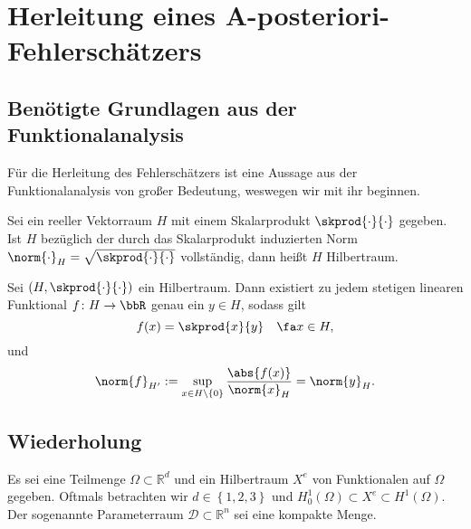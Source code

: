 
\section{Herleitung eines A-posteriori-Fehlerschätzers} %
\label{sec:herleitung}

\subsection{Benötigte Grundlagen aus der Funktionalanalysis} %
\label{sub:ben_tigte_grundlagen_aus_der_funktionalanalysis}

Für die Herleitung des Fehlerschätzers ist eine Aussage aus der Funktionalanalysis von großer Bedeutung, weswegen wir mit ihr beginnen.

\begin{Definition}[Hilbertraum]
    \label{def:hilbertraum}
    Sei ein reeller Vektorraum $H$ mit einem Skalarprodukt $\skprod{\cdot}{\cdot}$ gegeben.
    Ist $H$ bezüglich der durch das Skalarprodukt induzierten Norm $\norm{\cdot}_H = \sqrt{\skprod{\cdot}{\cdot}}$ vollständig, dann heißt $H$ Hilbertraum.
\end{Definition}

\begin{Satz}
    \label{satz:rieszscher_darstellungssatz}
    Sei $(H, \skprod{\cdot}{\cdot})$ ein Hilbertraum. Dann existiert zu jedem stetigen linearen Funktional $f \colon H \to \bbR$ genau ein $y \in H$, sodass gilt
    \begin{equation}
        f(x) = \skprod{x}{y} \quad \fa x \in H,
    \end{equation}
    und
    \begin{equation}
         \norm{f}_{H'} := \sup_{x \in H \setminus \left\{ 0 \right\}} \frac{\abs{f(x)}}{\norm{x}_H} = \norm{y}_H.
    \end{equation}
\end{Satz}

\subsection{Wiederholung} %
\label{sub:wiederholung}

Es sei eine Teilmenge $\Omega \subset \mathbb{R}^d$ und ein Hilbertraum $X^e$ von Funktionalen auf $\Omega$ gegeben.
Oftmals betrachten wir $d \in \left\{ 1, 2, 3 \right\}$ und $H^1_0(\Omega) \subset X^e \subset H^1(\Omega)$.
Der sogenannte Parameterraum $\mathcal D \subset \mathbb{R}^n$ sei eine kompakte Menge.

